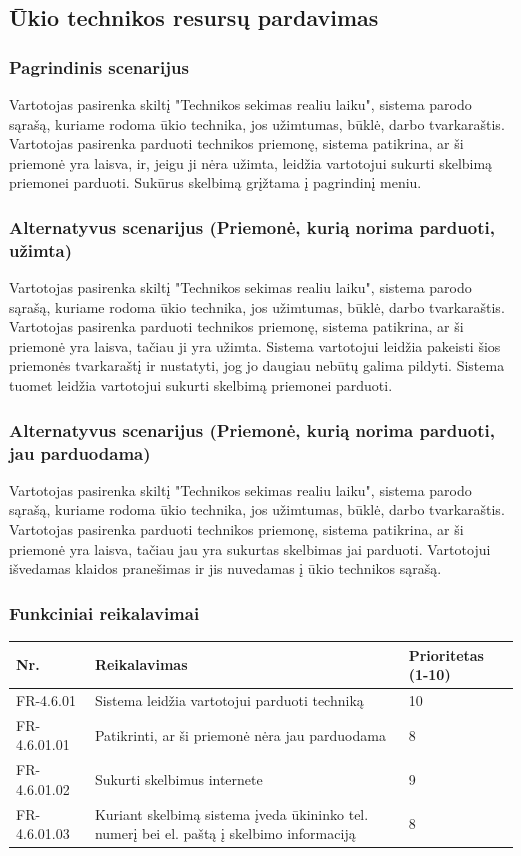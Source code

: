\documentclass[oneside]{VUMIFPSkursinis}
\begin{document}
\subsection{Ūkio technikos resursų pardavimas}
\subsubsection{Pagrindinis scenarijus}
	Vartotojas pasirenka skiltį "Technikos sekimas realiu laiku", sistema parodo sąrašą, kuriame rodoma ūkio technika, jos užimtumas, būklė, darbo tvarkaraštis. Vartotojas pasirenka parduoti technikos priemonę, sistema patikrina, ar ši priemonė yra laisva, ir, jeigu ji nėra užimta, leidžia vartotojui sukurti skelbimą priemonei parduoti. Sukūrus skelbimą grįžtama į pagrindinį meniu.
\subsubsection{Alternatyvus scenarijus (Priemonė, kurią norima parduoti, užimta)}
	Vartotojas pasirenka skiltį "Technikos sekimas realiu laiku", sistema parodo sąrašą, kuriame rodoma ūkio technika, jos užimtumas, būklė, darbo tvarkaraštis. Vartotojas pasirenka parduoti technikos priemonę, sistema patikrina, ar ši priemonė yra laisva, tačiau ji yra užimta. Sistema vartotojui leidžia pakeisti šios priemonės tvarkaraštį ir nustatyti, jog jo daugiau nebūtų galima pildyti. Sistema tuomet leidžia vartotojui sukurti skelbimą priemonei parduoti.
\subsubsection{Alternatyvus scenarijus (Priemonė, kurią norima parduoti, jau parduodama)}
	Vartotojas pasirenka skiltį "Technikos sekimas realiu laiku", sistema parodo sąrašą, kuriame rodoma ūkio technika, jos užimtumas, būklė, darbo tvarkaraštis. Vartotojas pasirenka parduoti technikos priemonę, sistema patikrina, ar ši priemonė yra laisva, tačiau jau yra sukurtas skelbimas jai parduoti. Vartotojui išvedamas klaidos pranešimas ir jis nuvedamas į ūkio technikos sąrašą.
\pagebreak
\subsubsection{Funkciniai reikalavimai}
\begin{table}[htbp]
	\begin{tabularx}{1\textwidth}{ |P{2.5cm}|X|P{3cm }| }  \hline
    Nr. & Reikalavimas &  Prioritetas (1-10)  \\   \hline 
    FR-4.6.01 & Sistema leidžia vartotojui parduoti techniką & 10  \\   \hline
		FR-4.6.01.01 & Patikrinti, ar ši priemonė nėra jau parduodama & 8 \\ \hline
		FR-4.6.01.02 & Sukurti skelbimus internete & 9 \\ \hline
		FR-4.6.01.03 & Kuriant skelbimą sistema įveda ūkininko tel. numerį bei el. paštą į skelbimo informaciją & 8 \\ \hline
	\end{tabularx}
\end{table}
\end{document}
